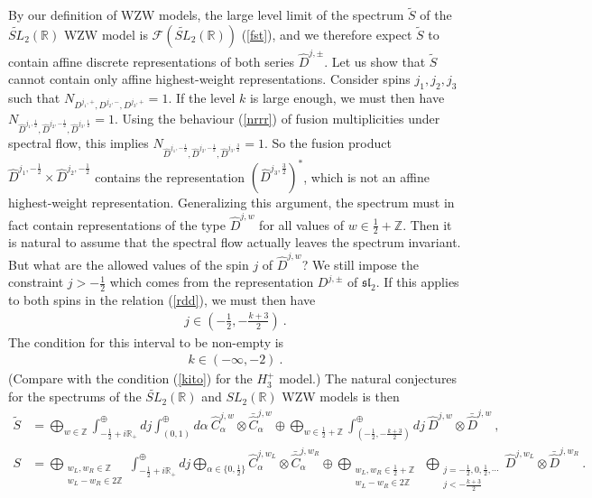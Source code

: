 \documentclass[12pt,a4paper,notitlepage]{report}
\newcommand \Z {\mathbb{Z}}
\newcommand \R {\mathbb{R}}
\numberwithin{equation}{section}
\theoremstyle{break}
\begin{document}
By our definition of WZW models, the large level limit of the spectrum $\tilde{S}$ of the $\widetilde{SL}_2(\mathbb{R})$ WZW model is $\mathcal{F}(\widetilde{SL}_2(\mathbb{R}))$ (\ref{fst}), and we therefore expect $\tilde{S}$ to contain affine discrete representations of both series $\hat{D}^{j,\pm}$. Let us show that $\tilde{S}$ cannot contain only affine highest-weight representations. Consider spins $j_1,j_2,j_3$ such that $N_{D^{j_1,+},D^{j_2,-},D^{j_3,+}}=1$. If the level $k$ is large enough, we must then have $N_{\hat{D}^{j_1,\frac12},\hat{D}^{j_2,-\frac12},\hat{D}^{j_3,\frac12}}=1$. Using the behaviour (\ref{nrrr}) of fusion multiplicities under spectral flow, this implies $N_{\hat{D}^{j_1,-\frac12},\hat{D}^{j_2,-\frac12},\hat{D}^{j_3,\frac32}}=1$. So the fusion product $\hat{D}^{j_1,-\frac12}\times \hat{D}^{j_2,-\frac12}$ contains the representation $(\hat{D}^{j_3,\frac32})^*$, which is not an affine highest-weight representation. Generalizing this argument, the spectrum must in fact contain 
representations of the type $\hat{D}^{j,w}$ for all values of $w\in \frac12+\Z$. Then it is natural to assume that the spectral flow actually leaves the spectrum invariant. But what are the allowed values of the spin $j$ of $\hat{D}^{j,w}$? We still impose the constraint $j>-\frac12$ which comes from the representation $D^{j,\pm}$ of $\mathfrak{sl}_2$. If this applies to both spins in the relation (\ref{rdd}), we must then have 
\begin{align}
 j\in \left(-\frac12, -\frac{k+3}{2}\right)\ .
\label{jimm}
\end{align}
The condition for this interval to be non-empty is
\begin{align}
 \boxed{k\in(-\infty,-2)}\ .
\end{align}
(Compare with the condition (\ref{kito}) for the $H_3^+$ model.) The natural conjectures for the spectrums of the $\widetilde{SL}_2(\mathbb{R})$ and $SL_2(\mathbb{R})$ WZW models is then
\begin{align}
 \tilde{S} &= \bigoplus_{w\in\Z}\int^\oplus_{-\frac12+i\R_+} dj \int^\oplus_{(0,1)} d\alpha\ \hat{C}^{j,w}_\alpha \otimes \bar{\hat{C}}^{j,w}_{\alpha} 
\oplus \bigoplus_{w\in\frac12+\Z}\int^\oplus_{(-\frac12,-\frac{k+3}{2})} dj\ \hat{D}^{j,w}\otimes \bar{\hat{D}}^{j,w} \ ,
\\
 S &= \bigoplus_{\substack{w_L,w_R\in\Z\\ w_L-w_R\in 2\Z}}\int^\oplus_{-\frac12+i\R_+} dj \bigoplus_{\alpha\in\{0,\frac12\}} \hat{C}^{j,w_L}_\alpha \otimes \bar{\hat{C}}^{j,w_R}_{\alpha} \oplus  \bigoplus_{\substack{w_L,w_R\in\frac12+\Z\\ w_L-w_R\in 2\Z}}\ \bigoplus_{\substack{j= -\frac12, 0,\frac12,\cdots \\ j<-\frac{k+3}{2}}} \hat{D}^{j,w_L}\otimes \bar{\hat{D}}^{j,w_R} \ .
\end{align}
\end{document}
